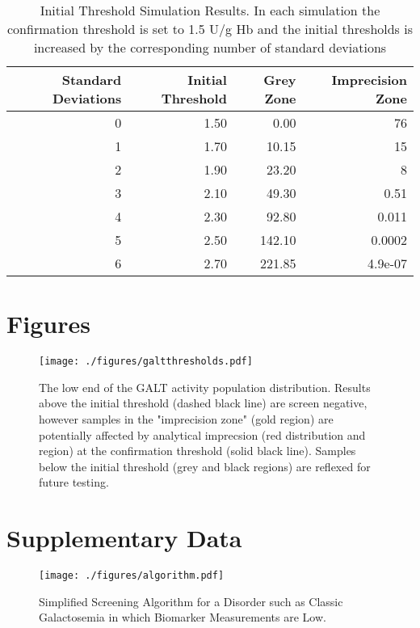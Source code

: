 \documentclass[review]{elsarticle}
\begin{document}
\begin{table}[ht]
\centering
\begin{tabular}{rrrr}
  \hline
Standard Deviations & Initial Threshold & Grey Zone & Imprecision Zone \\ 
  \hline
  0 & 1.50 & 0.00 &  76 \\ 
    1 & 1.70 & 10.15 &  15 \\ 
    2 & 1.90 & 23.20 &   8 \\ 
    3 & 2.10 & 49.30 & 0.51 \\ 
    4 & 2.30 & 92.80 & 0.011 \\ 
    5 & 2.50 & 142.10 & 0.0002 \\ 
    6 & 2.70 & 221.85 & 4.9e-07 \\ 
   \hline
\end{tabular}
\caption{Initial Threshold Simulation Results. In each simulation the confirmation threshold is set to 1.5 U/g Hb and the initial thresholds is increased by the corresponding number of standard deviations} 
\label{tab:imprecision}
\end{table}

\clearpage

\section*{Figures}
\label{sec:orge395576}

\begin{figure}[htbp]
\centering
\texttt{[image: ./figures/galtthresholds.pdf]}
\caption{\label{fig:org4a329fe}The low end of the GALT activity population distribution. Results above the initial threshold (dashed black line) are screen negative, however samples in the "imprecision zone" (gold region) are potentially affected by analytical imprecsion (red distribution and region) at the confirmation threshold (solid black line). Samples below the initial threshold (grey and black regions) are reflexed for future testing.}
\end{figure}

\clearpage

\section*{Supplementary Data}
\label{sec:org25fc512}

\beginsupplement

\begin{figure}[htbp]
\centering
\texttt{[image: ./figures/algorithm.pdf]}
\caption{\label{fig:orgf55d34c}Simplified Screening Algorithm for a Disorder such as Classic Galactosemia in which Biomarker Measurements are Low.}
\end{figure}
\end{document}
